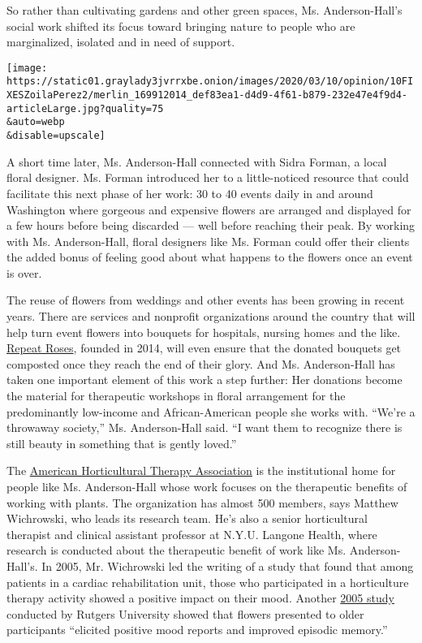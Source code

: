 So rather than cultivating gardens and other green spaces, Ms.
Anderson-Hall's social work shifted its focus toward bringing nature to
people who are marginalized, isolated and in need of support.

\texttt{[image: https://static01.graylady3jvrrxbe.onion/images/2020/03/10/opinion/10FIXESZoilaPerez2/merlin\_169912014\_def83ea1-d4d9-4f61-b879-232e47e4f9d4-articleLarge.jpg?quality=75\\\&auto=webp\\\&disable=upscale]}

A short time later, Ms. Anderson-Hall connected with Sidra Forman, a
local floral designer. Ms. Forman introduced her to a little-noticed
resource that could facilitate this next phase of her work: 30 to 40
events daily in and around Washington where gorgeous and expensive
flowers are arranged and displayed for a few hours before being
discarded --- well before reaching their peak. By working with Ms.
Anderson-Hall, floral designers like Ms. Forman could offer their
clients the added bonus of feeling good about what happens to the
flowers once an event is over.

The reuse of flowers from weddings and other events has been growing in
recent years. There are services and nonprofit organizations around the
country that will help turn event flowers into bouquets for hospitals,
nursing homes and the like. \href{https://repeatroses.com/}{Repeat
Roses}, founded in 2014, will even ensure that the donated bouquets get
composted once they reach the end of their glory. And Ms. Anderson-Hall
has taken one important element of this work a step further: Her
donations become the material for therapeutic workshops in floral
arrangement for the predominantly low-income and African-American people
she works with. ``We're a throwaway society,'' Ms. Anderson-Hall said.
``I want them to recognize there is still beauty in something that is
gently loved.''

The \href{https://www.ahta.org/}{American Horticultural Therapy
Association} is the institutional home for people like Ms. Anderson-Hall
whose work focuses on the therapeutic benefits of working with plants.
The organization has almost 500 members, says Matthew Wichrowski, who
leads its research team. He's also a senior horticultural therapist and
clinical assistant professor at N.Y.U. Langone Health, where research is
conducted about the therapeutic benefit of work like Ms.
Anderson-Hall's. In 2005, Mr. Wichrowski led the writing of a study that
found that among patients in a cardiac rehabilitation unit, those who
participated in a horticulture therapy activity showed a positive impact
on their mood. Another
\href{https://journals.sagepub.com/doi/pdf/10.1177/147470490500300109}{2005
study} conducted by Rutgers University showed that flowers presented to
older participants ``elicited positive mood reports and improved
episodic memory.''

